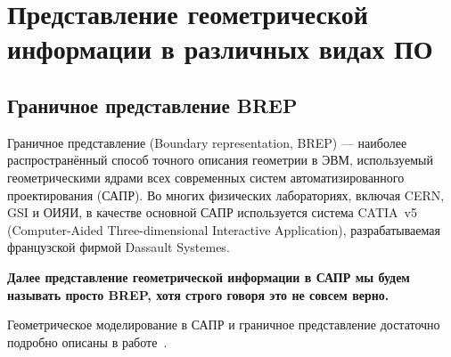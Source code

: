 \section{Представление геометрической информации в различных видах ПО}\label{sec:geoDifferentReprs}


\subsection{Граничное представление BREP}\label{sec:geoCAD}

Граничное представление (Boundary representation, BREP) --- наиболее распространённый способ точного описания геометрии в ЭВМ, используемый геометрическими ядрами всех современных систем автоматизированного проектирования (САПР).
Во многих физических лабораториях, включая CERN, GSI и ОИЯИ, в качестве основной САПР используется система CATIA~v5 (Computer-Aided Three-dimensional Interactive Application), разрабатываемая французской фирмой Dassault Systemes.

\textbf{Далее представление геометрической информации в САПР мы будем называть просто BREP, хотя строго говоря это не совсем верно.}

Геометрическое моделирование в САПР и граничное представление достаточно подробно описаны в работе~\cite{Golovanov}.

